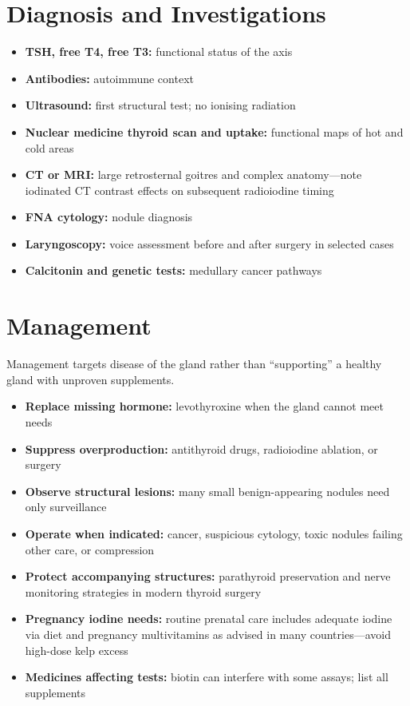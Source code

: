 \section*{Diagnosis and Investigations}
\begin{itemize}
    \item \textbf{TSH, free T4, free T3:} functional status of the axis
    \item \textbf{Antibodies:} autoimmune context
    \item \textbf{Ultrasound:} first structural test; no ionising radiation
    \item \textbf{Nuclear medicine thyroid scan and uptake:} functional maps of hot and cold areas
    \item \textbf{CT or MRI:} large retrosternal goitres and complex anatomy---note iodinated CT contrast effects on subsequent radioiodine timing
    \item \textbf{FNA cytology:} nodule diagnosis
    \item \textbf{Laryngoscopy:} voice assessment before and after surgery in selected cases
    \item \textbf{Calcitonin and genetic tests:} medullary cancer pathways
\end{itemize}

\section*{Management}
Management targets disease of the gland rather than ``supporting'' a healthy gland with unproven supplements.

\begin{itemize}
    \item \textbf{Replace missing hormone:} levothyroxine when the gland cannot meet needs
    \item \textbf{Suppress overproduction:} antithyroid drugs, radioiodine ablation, or surgery
    \item \textbf{Observe structural lesions:} many small benign-appearing nodules need only surveillance
    \item \textbf{Operate when indicated:} cancer, suspicious cytology, toxic nodules failing other care, or compression
    \item \textbf{Protect accompanying structures:} parathyroid preservation and nerve monitoring strategies in modern thyroid surgery
    \item \textbf{Pregnancy iodine needs:} routine prenatal care includes adequate iodine via diet and pregnancy multivitamins as advised in many countries---avoid high-dose kelp excess
    \item \textbf{Medicines affecting tests:} biotin can interfere with some assays; list all supplements
\end{itemize}

